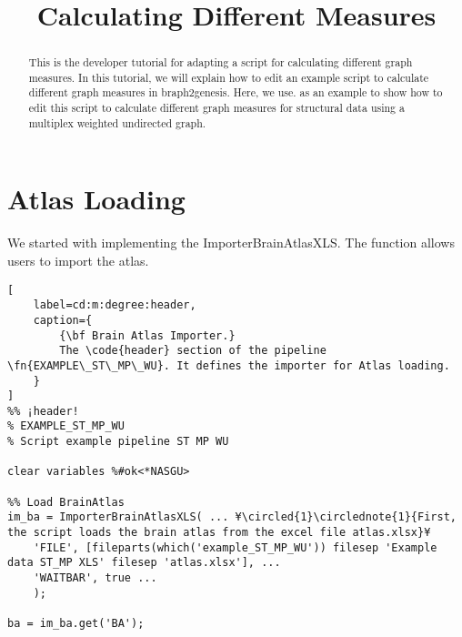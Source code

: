 \documentclass{tufte-handout}
\title{Calculating Different Measures}
\begin{document}
\maketitle

\begin{abstract}
\noindent
This is the developer tutorial for adapting a script for calculating different graph measures. In this tutorial, we will explain how to edit an example script to calculate different graph measures in braph2genesis. Here, we use.  as an example to show how to edit this script to calculate different graph measures for structural data using a multiplex weighted undirected graph.
\end{abstract}

\tableofcontents

\clearpage
\section{Atlas Loading}
We started with implementing the ImporterBrainAtlasXLS. The function allows users to import the atlas. 
\begin{lstlisting}[
	label=cd:m:degree:header,
	caption={
		{\bf Brain Atlas Importer.}
		The \code{header} section of the pipeline \fn{EXAMPLE\_ST\_MP\_WU}. It defines the importer for Atlas loading.
	}
]
%% ¡header!
% EXAMPLE_ST_MP_WU
% Script example pipeline ST MP WU

clear variables %#ok<*NASGU>

%% Load BrainAtlas
im_ba = ImporterBrainAtlasXLS( ... ¥\circled{1}\circlednote{1}{First, the script loads the brain atlas from the excel file atlas.xlsx}¥
    'FILE', [fileparts(which('example_ST_MP_WU')) filesep 'Example data ST_MP XLS' filesep 'atlas.xlsx'], ...
    'WAITBAR', true ...
    );

ba = im_ba.get('BA');
\end{lstlisting}





\end{document}
